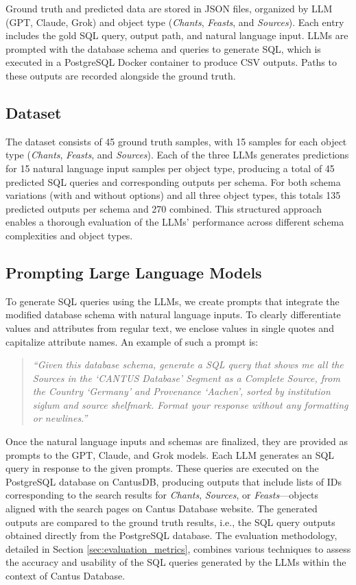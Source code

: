 Ground truth and predicted data are stored in JSON files, organized by LLM (GPT, Claude, Grok) and object type (\textit{Chants}, \textit{Feasts}, and \textit{Sources}). Each entry includes the gold SQL query, output path, and natural language input. LLMs are prompted with the database schema and queries to generate SQL, which is executed in a PostgreSQL Docker container to produce CSV outputs. Paths to these outputs are recorded alongside the ground truth.

\subsection{Dataset}
The dataset consists of 45 ground truth samples, with 15 samples for each object type (\textit{Chants}, \textit{Feasts}, and \textit{Sources}). Each of the three LLMs generates predictions for 15 natural language input samples per object type, producing a total of 45 predicted SQL queries and corresponding outputs per schema. For both schema variations (with and without options) and all three object types, this totals 135 predicted outputs per schema and 270 combined. This structured approach enables a thorough evaluation of the LLMs' performance across different schema complexities and object types.

\subsection{Prompting Large Language Models}
To generate SQL queries using the LLMs, we create prompts that integrate the modified database schema with natural language inputs. To clearly differentiate values and attributes from regular text, we enclose values in single quotes and capitalize attribute names. An example of such a prompt is:
\begin{quote}
\textit{``Given this database schema, generate a SQL query that shows me all the Sources in the `CANTUS Database' Segment as a Complete Source, from the Country `Germany' and Provenance `Aachen', sorted by institution siglum and source shelfmark. Format your response without any formatting or newlines.''}
\end{quote}

Once the natural language inputs and schemas are finalized, they are provided as prompts to the GPT, Claude, and Grok models. Each LLM generates an SQL query in response to the given prompts. These queries are executed on the PostgreSQL database on CantusDB, producing outputs that include lists of IDs corresponding to the search results for \textit{Chants}, \textit{Sources}, or \textit{Feasts}—objects aligned with the search pages on Cantus Database website. The generated outputs are compared to the ground truth results, i.e., the SQL query outputs obtained directly from the PostgreSQL database. The evaluation methodology, detailed in Section \ref{sec:evaluation_metrics}, combines various techniques to assess the accuracy and usability of the SQL queries generated by the LLMs within the context of Cantus Database.

